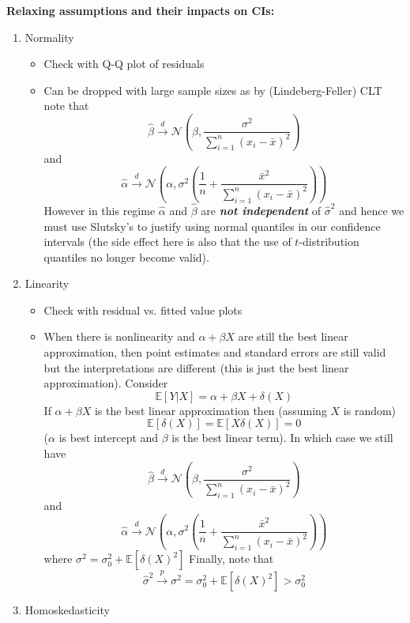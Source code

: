 \documentclass{article}
\begin{document}
\textbf{Relaxing assumptions and their impacts on CIs:}
\begin{enumerate}
  \item Normality
    \begin{itemize}
      \item Check with Q-Q plot of residuals
      \item Can be dropped with large sample sizes as by (Lindeberg-Feller) CLT note that
        \[\hat{\beta} \xrightarrow{d} \mathcal{N}\left(\beta, \frac{\sigma^2}{\sum_{i=1}^{n}(x_i - \bar{x})^2}\right) \]
        and
        \[\hat{\alpha} \xrightarrow{d} \mathcal{N}\left(\alpha, \sigma^2 \left(\frac{1}{n} + \frac{\bar{x}^2}{\sum_{i=1}^{n}(x_i - \bar{x})^2} \right) \right) \]
        However in this regime $\hat{\alpha}$ and $\hat{\beta}$ are \textbf{\textit{not independent}} of $\hat{\sigma}^2$ and hence we must use Slutsky's to justify
        using normal quantiles in our confidence intervals (the side effect here is also that the use of  $t$-distribution quantiles no longer become valid).
    \end{itemize}
  \item Linearity
    \begin{itemize}
      \item Check with residual vs. fitted value plots
      \item When there is nonlinearity and $\alpha + \beta X$ are still the best linear approximation, then point estimates and standard errors are still valid but the interpretations are different (this is just the best linear approximation).
        Consider \[\mathbb{E}[Y|X] = \alpha + \beta X + \delta(X)\]
        If $\alpha + \beta X$ is the best linear approximation then (assuming $X$ is random)
        \[\mathbb{E}[\delta(X)] = \mathbb{E}[X \delta(X)] = 0\]
        ($\alpha$ is best intercept and $\beta$ is the best linear term). In which case we still have
        \[\hat{\beta} \xrightarrow{d} \mathcal{N}\left(\beta, \frac{\sigma^2}{\sum_{i=1}^{n}(x_i - \bar{x})^2}\right) \]
        and
        \[\hat{\alpha} \xrightarrow{d} \mathcal{N}\left(\alpha, \sigma^2 \left(\frac{1}{n} + \frac{\bar{x}^2}{\sum_{i=1}^{n}(x_i - \bar{x})^2} \right) \right) \]
        where $\sigma^2 = \sigma^2_0 + \mathbb{E}[\delta(X)^2]$
        Finally, note that
        \[\hat{\sigma}^2 \xrightarrow{p} \sigma^2 = \sigma^2_0 + \mathbb{E}[\delta(X)^2] > \sigma^2_0\]
    \end{itemize}
  \item Homoskedasticity
    \begin{itemize}

\end{itemize}
\end{enumerate}
\end{document}
